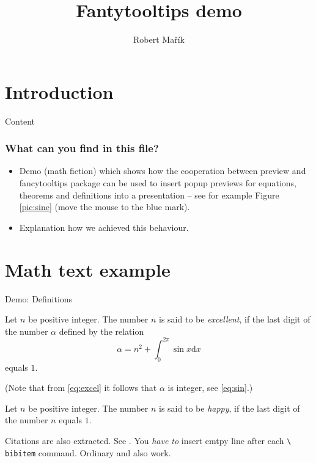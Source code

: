 \documentclass[envcountsect,t,10pt]{beamer}
\def\dx{{\mathrm d}x}
\begin{document}
\title{Fantytooltips demo}
\author{Robert Ma\v{r}\'ik}

\maketitle
\section{Introduction}

\begin{frame}{Content}
  \tableofcontents
\end{frame}
\begin{frame}
  \frametitle{What can you find in this file?}
  \begin{itemize}
  \item Demo (math fiction) which shows how the cooperation between
    preview and fancytooltips package can be used to insert popup
    previews for equations, theorems and definitions into a
    presentation -- see for example Figure \ref{pic:sine} (move the
    mouse to the blue mark).
  \item Explanation how we achieved this behaviour.
  \end{itemize}
\end{frame}

\section{Math text example}

\begin{frame}{Demo: Definitions}
  \begin{definition}
    Let $n$ be positive integer. The number $n$ is said to be
    \textit{excellent}, if the last digit of the number $\alpha$
    defined by the relation
    \begin{equation}
      \label{eq:excel}
      \alpha = n^2 +\int_0^{2\pi}\sin x\dx
    \end{equation}
    equals $1$.\label{def:excellent-number}
  \end{definition}
  
  {(Note that from \eqref{eq:excel} it follows that $\alpha$ is
    integer, see \ref{eq:sin}.) }
  
  {\begin{definition}
      Let $n$ be positive integer. The number $n$ is said to be
      \textit{happy}, if the last digit of the number $n$ equals $1$.
      \label{def:happy-number}
    \end{definition}}
    
    {Citations are also extracted.  See \cite{D,D-R,D-F,D-Rez}. You
      \textit{have to} insert emtpy line after each \texttt{\textbackslash
        bibitem} command. Ordinary  and
       also work.}
  \end{frame}
\end{document}
